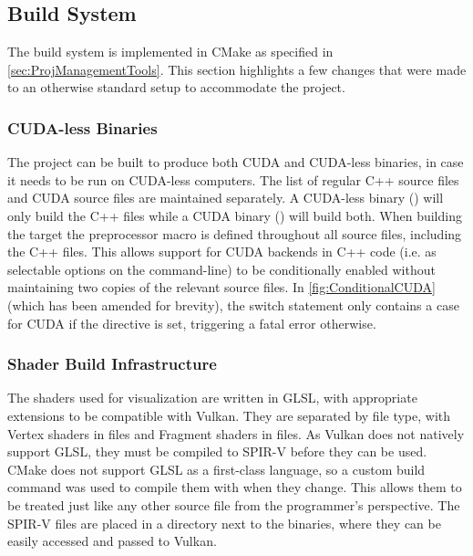 \subsection{Build System}
The build system is implemented in CMake as specified in \cref{sec:ProjManagementTools}. %
This section highlights a few changes that were made to an otherwise standard setup to accommodate the project.

\subsubsection{CUDA-less Binaries}
The project can be built to produce both CUDA and CUDA-less binaries, in case it needs to be run on CUDA-less computers.
The list of regular C++ source files and CUDA source files are maintained separately. A CUDA-less binary () will only build the C++ files while a CUDA binary () will build both.
When building the  target the preprocessor macro  is defined throughout all source files, including the C++ files.
This allows support for CUDA backends in C++ code (i.e. as selectable options on the command-line) to be conditionally enabled without maintaining two copies of the relevant source files.
In \cref{fig:ConditionalCUDA} (which has been amended for brevity), the switch statement only contains a case for CUDA if the directive is set, triggering a fatal error otherwise.



\subsubsection{Shader Build Infrastructure} %
The shaders used for visualization are written in GLSL, with appropriate extensions to be compatible with Vulkan.
They are separated by file type, with Vertex shaders in  files and Fragment shaders in  files.
As Vulkan does not natively support GLSL, they must be compiled to SPIR-V before they can be used.
CMake does not support GLSL as a first-class language, so a custom build command was used to compile them with \cite{GoogleLLCShaderc} when they change.
This allows them to be treated just like any other source file from the programmer's perspective.
The SPIR-V files are placed in a  directory next to the binaries, where they can be easily accessed and passed to Vulkan.